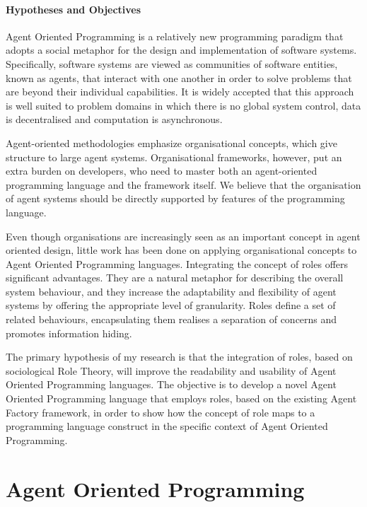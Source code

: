 \documentclass[a4paper,12pt,oneside,fleqn]{book} %
\newcommand{\rg}[1]{\marginpar{\tiny\raggedright\textcolor{blue}{\bf rg:} #1}}
\begin{document}
\subsubsection{Hypotheses and Objectives}
Agent Oriented Programming is a relatively new programming paradigm that
adopts a social metaphor for the design and implementation of software
systems.  Specifically, software systems are viewed as communities of
software entities, known as agents, that interact with one another in order
to solve problems that are beyond their individual capabilities. It is
widely accepted that this approach is well suited to problem domains in
which there is no global system control, data is decentralised and
computation is asynchronous.

Agent-oriented methodologies emphasize organisational concepts, which give
structure to large agent systems. Organisational frameworks, however, put
an extra burden on developers, who need to master both an agent-oriented
programming language and the framework itself. We believe that the
organisation of agent systems should be directly supported by features of
the programming language.

Even though organisations are increasingly seen as an important concept in
agent oriented design, little work has been done on applying organisational
concepts to Agent Oriented Programming languages. Integrating the concept
of roles offers significant advantages. They are a natural metaphor for
describing the overall system behaviour, and they increase the adaptability
and flexibility of agent systems by offering the appropriate level of
granularity. Roles define a set of related behaviours, encapsulating them
realises a separation of concerns and promotes information hiding.

The primary hypothesis of my research is that the integration of roles,
based on sociological Role Theory, will improve the readability and
usability of Agent Oriented Programming languages. The objective is to
develop a novel Agent Oriented Programming language that employs roles,
based on the existing Agent Factory framework, in order to show how the
concept of role maps to a programming language construct in the specific
context of Agent Oriented Programming.  



\chapter{Agent Oriented Programming}\label{ch:aop} %
\end{document}
